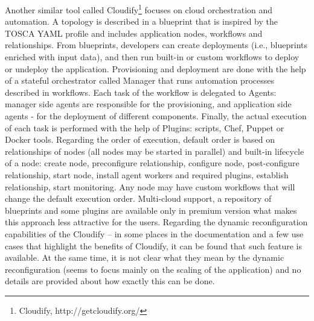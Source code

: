 \noindent Another similar tool called Cloudify\footnote{ Cloudify, $  $http://getcloudify.org/} focuses on cloud orchestration and automation. A topology is described in a blueprint that is inspired by the TOSCA YAML profile and includes application nodes, workflows and relationships. From blueprints, developers can create deployments (i.e., blueprints enriched with input data), and then run built-in or custom workflows to deploy or undeploy the application. Provisioning and deployment are done with the help of a stateful orchestrator called Manager that runs automation processes described in workflows. Each task of the workflow is delegated to Agents: manager side agents are responsible for the provisioning, and application side agents - for the deployment of different components. Finally, the actual execution of each task is performed with the help of Plugins: scripts, Chef, Puppet or Docker tools. Regarding the order of execution, default order is based on relationships of nodes (all nodes may be started in parallel) and built-in lifecycle of a node: create node, preconfigure relationship, configure node, post-configure relationship, start node, install agent workers and required plugins, establish relationship, start monitoring. Any node may have custom workflows that will change the default execution order. Multi-cloud support, a repository of blueprints and some plugins are available only in premium version what makes this approach less attractive for the users. Regarding the dynamic reconfiguration capabilities of the Cloudify -- in some places in the documentation and a few use cases that highlight the benefits of Cloudify, it can be found that such feature is available. At the same time, it is not clear what they mean by the dynamic reconfiguration (seems to focus mainly on the scaling of the application) and no details are provided about how exactly this can be done.

\noindent 

